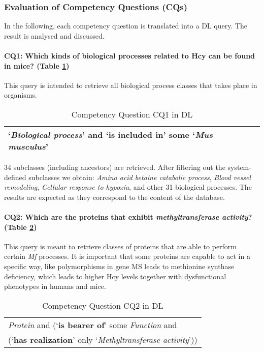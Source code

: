 \subsubsection{Evaluation of Competency Questions (CQs)}
\label{section:CQ}
In the following, each competency question is translated into a DL query. The result is analysed and discussed.  

\paragraph{CQ1:	Which kinds of biological processes related to Hcy can be found in mice? (Table \ref{table:cq1})}
This query is intended to retrieve all biological process classes that takes place in organisms.  

\begin{table}[H]
	\caption{Competency Question CQ1 in DL}
	\centering
	\label{table:cq1}
	\begin{tabular}{p{3in}}
		\hline
			`\textit{Biological process}' and `\textbf{is included in}'  some `\textit{Mus musculus}' \\
		\hline
	\end{tabular} 
\end{table}

34 subclasses (including ancestors) are retrieved. After filtering out the system-defined subclasses we obtain: \textit{Amino acid betaine catabolic process}, \textit{Blood vessel remodeling}, \textit{Cellular response to hypoxia}, and other 31 biological processes. The results are expected 
as they correspond to the content of the database.

\paragraph{CQ2: Which are the proteins that exhibit \textit{methyltransferase activity}?  (Table \ref{table:CQ2})}
This query is meant to retrieve classes of proteins that are able to perform certain \textit{Mf} processes. It is important that some proteins are capable to act in a specific way, like polymorphisms in gene MS leads to methionine synthase deficiency, which leads to higher Hcy levels together with dysfunctional phenotypes in humans and mice. 
\begin{table}[H]
	\caption{Competency Question CQ2 in DL}
	\centering
	\label{table:CQ2}

\begin{tabular}{p{3in}}
	\hline  
		\textit{Protein} and (`\textbf{is bearer of}' some \textit{Function} and \\
		\hspace{0.5cm} (`\textbf{has realization}' only `\textit{Methyltransferase activity}')) \\ 
	\hline 
\end{tabular} 
\end{table}

